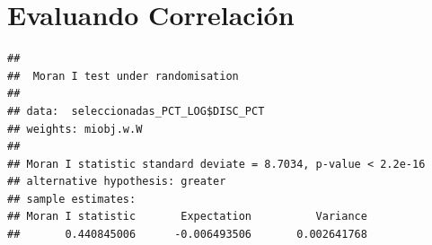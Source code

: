 \documentclass[11pt,]{article}
\newenvironment{Shaded}{\begin{snugshade}}{\end{snugshade}}
\newcommand{\KeywordTok}[1]{\textcolor[rgb]{0.13,0.29,0.53}{\textbf{#1}}}
\newcommand{\DataTypeTok}[1]{\textcolor[rgb]{0.13,0.29,0.53}{#1}}
\newcommand{\StringTok}[1]{\textcolor[rgb]{0.31,0.60,0.02}{#1}}
\newcommand{\OperatorTok}[1]{\textcolor[rgb]{0.81,0.36,0.00}{\textbf{#1}}}
\newcommand{\NormalTok}[1]{#1}
\begin{document}
\begin{Shaded}
\begin{Highlighting}[]
{{\NormalTok{seleccionadas_PCT_LOG <-}\StringTok{ }\NormalTok{seleccionadas_PCT }\OperatorTok{%
\end{Highlighting}
\end{Shaded}

\section{Evaluando Correlación}\label{evaluando-correlaciuxf3n}

\begin{Shaded}
\end{Shaded}

\begin{verbatim}
## 
##  Moran I test under randomisation
## 
## data:  seleccionadas_PCT_LOG$DISC_PCT  
## weights: miobj.w.W    
## 
## Moran I statistic standard deviate = 8.7034, p-value < 2.2e-16
## alternative hypothesis: greater
## sample estimates:
## Moran I statistic       Expectation          Variance 
##       0.440845006      -0.006493506       0.002641768
\end{verbatim}
\end{document}
